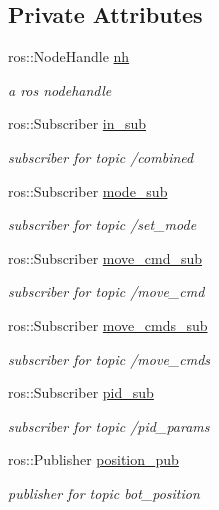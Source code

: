 \subsection*{Private Attributes}
\begin{DoxyCompactItemize}
\item 
ros\+::\+Node\+Handle \hyperlink{classControl_a8aa280a2e58b01b8cc3a62f839b28761}{nh}
\begin{DoxyCompactList}\small\item\em a ros nodehandle \end{DoxyCompactList}\item 
ros\+::\+Subscriber \hyperlink{classControl_a0aa8e9ce906bd50de463b07fce71f7b8}{in\+\_\+sub}
\begin{DoxyCompactList}\small\item\em subscriber for topic /combined \end{DoxyCompactList}\item 
ros\+::\+Subscriber \hyperlink{classControl_aa69c6ea7a8de7db73035a1db99ab3b47}{mode\+\_\+sub}
\begin{DoxyCompactList}\small\item\em subscriber for topic /set\+\_\+mode \end{DoxyCompactList}\item 
ros\+::\+Subscriber \hyperlink{classControl_a3b230d6b582855242669b6fffbb3d949}{move\+\_\+cmd\+\_\+sub}
\begin{DoxyCompactList}\small\item\em subscriber for topic /move\+\_\+cmd \end{DoxyCompactList}\item 
ros\+::\+Subscriber \hyperlink{classControl_aef0dbc702813737f7860676376c58e2e}{move\+\_\+cmds\+\_\+sub}
\begin{DoxyCompactList}\small\item\em subscriber for topic /move\+\_\+cmds \end{DoxyCompactList}\item 
ros\+::\+Subscriber \hyperlink{classControl_adee654d9ea9ce8b55e7a54f24b9bc8cf}{pid\+\_\+sub}
\begin{DoxyCompactList}\small\item\em subscriber for topic /pid\+\_\+params \end{DoxyCompactList}\item 
ros\+::\+Publisher \hyperlink{classControl_ae5593e99df99f6e78c3c3fba9cefa187}{position\+\_\+pub}
\begin{DoxyCompactList}\small\item\em publisher for topic bot\+\_\+position \end{DoxyCompactList}\item 

\end{DoxyCompactItemize}
